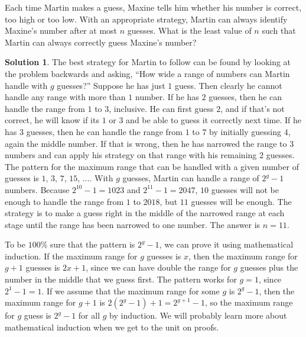 \documentclass{article}
\theoremstyle{definition}
\newtheorem*{solution}{Solution}
\begin{document}
\begin{multicols}{2}
\begin{enumerate}
        Each time Martin makes a guess, Maxine tells him whether his number is correct, too high or too low.
        With an appropriate strategy, Martin can always identify Maxine's number after at most $n$ guesses.
        What is the least value of $n$ such that Martin can always correctly guess Maxine's number?
        \begin{solution}
            The best strategy for Martin to follow can be found by looking at the problem backwards
            and asking, ``How wide a range of numbers can Martin handle with $g$ guesses?''
            Suppose he has just $1$ guess. Then clearly he cannot handle any range with more than $1$ number.
            If he has $2$ guesses, then he can handle the range from $1$ to $3$, inclusive.
            He can first guess $2$, and if that's not correct, he will know if its $1$ or $3$ and be able to guess it correctly next time.
            If he has $3$ guesses, then he can handle the range from $1$ to $7$ by initially guessing $4$, again the middle number.
            If that is wrong, then he has narrowed the range to $3$ numbers and can apply his strategy on that range with his remaining $2$ guesses.
            The pattern for the maximum range that can be handled with a given number of guesses is $1$, $3$, $7$, $15$, $\dots$.
            With $g$ guesses, Martin can handle a range of $2^g - 1$ numbers.
            Because $2^{10} - 1 = 1023$ and $2^11 - 1 = 2047$, $10$ guesses will not be enough to handle the range from $1$ to $2018$, but $11$ guesses will be enough.
            The strategy is to make a guess right in the middle of the narrowed range at each stage until the range has been narrowed to one number.
            The answer is $n = \boxed{11}$.

            To be $100\%$ sure that the pattern is $2^g - 1$, we can prove it using mathematical induction.
            If the maximum range for $g$ guesses is $x$, then the maximum range for $g + 1$ guesses is $2x + 1$, since we can have double the range for $g$ guesses plus the number in the middle that we guess first.
            The pattern works for $g = 1$, since $2^1 - 1 = 1$.
            If we assume that the maximum range for some $g$ is $2^g - 1$, then the maximum range for $g + 1$ is $2(2^g - 1) + 1 = 2^{g + 1} - 1$, so the maximum range for $g$ guess is $2^g - 1$ for all $g$ by induction.
            We will probably learn more about mathematical induction when we get to the unit on proofs.
        \end{solution}
    \end{enumerate}
\end{multicols}
\end{document}
